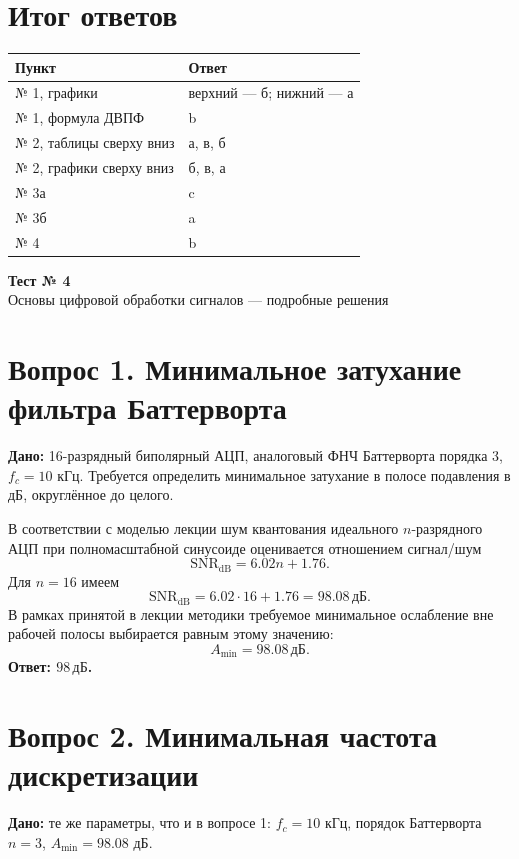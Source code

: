 \documentclass[12pt,a4paper]{article}
\begin{document}
\section*{Итог ответов}
\begin{center}
\begin{tabular}{ll}
\toprule
Пункт & Ответ\\
\midrule
№ 1, графики & верхний --- б; нижний --- а\\
№ 1, формула ДВПФ & b\\
№ 2, таблицы сверху вниз & а, в, б\\
№ 2, графики сверху вниз & б, в, а\\
№ 3а & c\\
№ 3б & a\\
№ 4 & b\\
\bottomrule
\end{tabular}
\end{center}

\clearpage
\begin{center}
{\Huge\bfseries Тест № 4}\\[8pt]
{\large Основы цифровой обработки сигналов — подробные решения}
\end{center}
\vspace{8mm}
\section*{Вопрос 1. Минимальное затухание фильтра Баттерворта}
\textbf{Дано:} 16-разрядный биполярный АЦП, аналоговый ФНЧ Баттерворта порядка 3, $f_c=10$ кГц. Требуется определить минимальное затухание в полосе подавления в дБ, округлённое до целого.

В соответствии с моделью лекции шум квантования идеального $n$-разрядного АЦП при полномасштабной синусоиде оценивается отношением сигнал/шум
\[
\mathrm{SNR}_{\mathrm{dB}}=6.02n+1.76.
\]
Для $n=16$ имеем
\[
\mathrm{SNR}_{\mathrm{dB}}=6.02\cdot16+1.76=98.08\,\text{дБ}.
\]
В рамках принятой в лекции методики требуемое минимальное ослабление вне рабочей полосы выбирается равным этому значению:
\[
A_{\min}=98.08\,\text{дБ}.
\]
\textbf{Ответ: $\boxed{98\,\text{дБ}}$.}

\section*{Вопрос 2. Минимальная частота дискретизации}
\textbf{Дано:} те же параметры, что и в вопросе 1: $f_c=10$ кГц, порядок Баттерворта $n=3$, $A_{\min}=98.08$ дБ.
\end{document}
